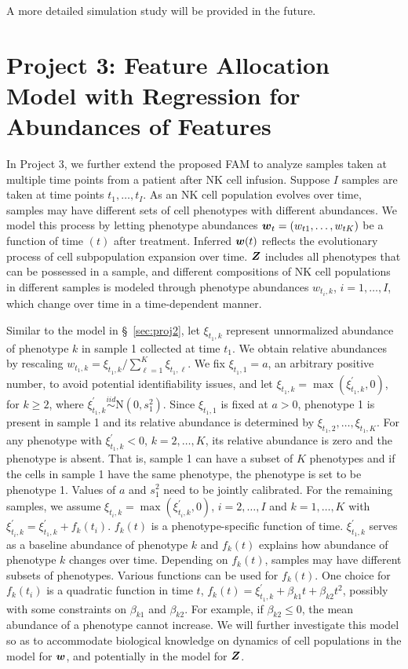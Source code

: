 \documentclass[12pt,]{article}
\newcommand{\N}{ \mathcal{N} }
\newcommand{\iid}{\overset{iid}{\sim}}
\def\N{\text{N}}
\newcommand{\bZ}{\mbox{\boldmath $Z$}}
\newcommand{\bw}{\mbox{\boldmath $w$}}
\begin{document}
A more detailed simulation study will be provided in the future.


\section{Project 3: Feature Allocation Model with Regression for Abundances of
Features}\label{sec:proj3}
In Project 3, we further extend the proposed FAM to analyze samples taken at
multiple time points from a patient after NK cell infusion. Suppose $I$ samples
are taken at time points $t_1, \ldots, t_I$.   As an NK cell population evolves
over time, samples may have different sets of cell phenotypes with different
abundances. We model this process by letting phenotype abundances
$\bw_{t}=(w_{t1}, \ldots, w_{tK})$ be a function of time $(t)$ after treatment.
Inferred $\bw(t)$ reflects the evolutionary process of cell subpopulation
expansion over time.   $\bZ$ includes all phenotypes that can be possessed in a
sample, and different compositions of NK cell populations in different samples is
modeled through phenotype abundances $w_{t_i, k}$, $i=1, \ldots, I$, which
change over time in a time-dependent manner.


Similar to the model in \S~\ref{sec:proj2}, let $\xi_{t_1,k}$ represent
unnormalized abundance of phenotype $k$ in sample 1 collected at time $t_1$.
We obtain relative abundances by rescaling $w_{t_1,k}=
\xi_{t_1,k}/\sum_{\ell=1}^K \xi_{t_1, \ell}$.  We fix $\xi_{t_1,1}=a$, an
arbitrary positive number, to avoid potential identifiability issues, and let
$\xi_{t_1,k} = \max(\xi^\prime_{t_1,k}, 0)$, for $k\ge 2$, where
$\xi^\prime_{t_1,k} \iid \N(0, s^2_1)$.  Since $\xi_{t_1, 1}$ is fixed at
$a>0$, phenotype 1 is present in sample 1 and its relative abundance is
determined by $\xi_{t_1, 2}, \ldots, \xi_{t_1, K}$.  For any phenotype with
$\xi^\prime_{t_1, k} < 0$, $k=2, \ldots, K$, its relative abundance is zero and
the phenotype is absent.  That is, sample 1 can have a subset of $K$ phenotypes
and if the cells in sample 1 have the same phenotype, the phenotype is set to be
phenotype 1. Values of $a$ and $s^2_1$ need to be jointly calibrated. For the
remaining samples, we assume $\xi_{t_i,k} = \max(\xi^\prime_{t_i,k}, 0)$, $i=2,
\ldots, I$ and $k=1, \ldots, K$ with $\xi^\prime_{t_i,k} = \xi^\prime_{t_1, k}
+ f_k(t_i)$. $f_k(t)$ is a phenotype-specific function of time.
$\xi^\prime_{t_1, k}$ serves as a baseline abundance of phenotype $k$ and
$f_k(t)$ explains how abundance of phenotype $k$ changes over time.
Depending on $f_k(t)$, samples may have different subsets of phenotypes.
Various functions can be used for $f_k(t)$.  One choice for $f_k(t_i)$ is a
quadratic function in time $t$, $f_k(t) = \xi^\prime_{t_1,k} + \beta_{k1}t +
\beta_{k2}t^2$, possibly with some constraints on $\beta_{k1}$ and
$\beta_{k2}.$  For example, if $\beta_{k2} \leq 0$, the mean abundance of a
phenotype cannot increase.  We will further investigate this model so as to
accommodate biological knowledge on dynamics of cell populations in the model
for $\bw$, and potentially in the model for $\bZ$.   
\end{document}
